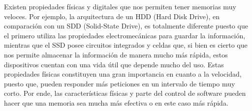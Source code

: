 \documentclass{article}
\begin{document}
Existen propiedades físicas y digitales que nos permiten tener memorias muy veloces. Por ejemplo, la arquitectura de un HDD (Hard Disk Drive), en comparación con un SDD (Solid-State Drive), es totalmente diferente puesto que el primero utiliza las propiedades electromecánicas para guardar la información, mientras que el SSD posee circuitos integrados y celdas que, si bien es cierto que nos permite almacenar la información de manera mucho más rápida, estos dispositivos cuentan con una vida útil que depende mucho del uso. Estas propiedades físicas constituyen una gran importancia en cuanto a la velocidad, puesto que, pueden responder más peticiones en un intervalo de tiempo muy corto. Por ende, las características físicas y parte del control de software pueden hacer que una memoria sea mucha más efectiva o en este caso más rápida.    
 



\end{document}
